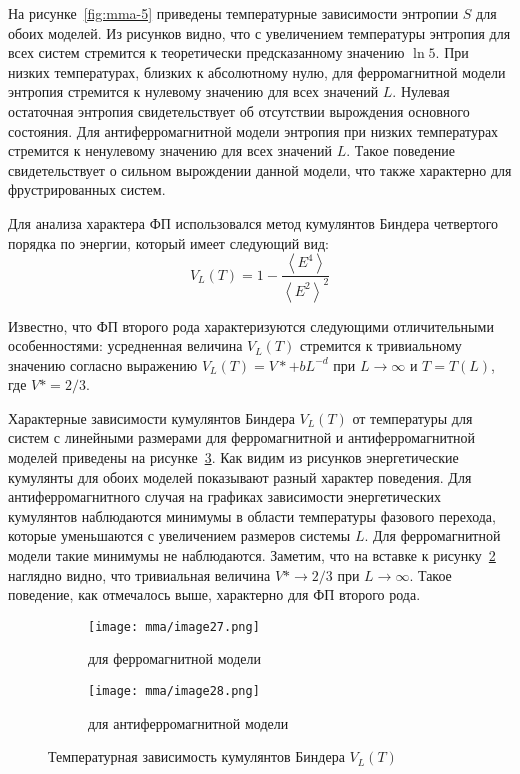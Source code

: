 На рисунке~\ref{fig:mma-5} приведены температурные зависимости энтропии $S$ для обоих моделей. Из рисунков видно, что с увеличением температуры энтропия для всех систем стремится к теоретически предсказанному значению $\ln 5$. При низких температурах, близких к абсолютному нулю, для ферромагнитной модели энтропия стремится к нулевому значению для всех значений $L$. Нулевая остаточная энтропия свидетельствует об отсутствии вырождения основного состояния. Для антиферромагнитной модели энтропия при низких температурах стремится к ненулевому значению для всех значений $L$. Такое поведение свидетельствует о сильном вырождении данной модели, что также характерно для фрустрированных систем.

Для анализа характера ФП использовался метод кумулянтов Биндера четвертого порядка по энергии, который имеет следующий вид:
\begin{equation*}
    V_L (T) = 1 - \frac{\left<E^4\right>}{\left<E^2\right>^2}
\end{equation*}

Известно, что ФП второго рода характеризуются следующими отличительными особенностями: усредненная величина $V_L (T)$ стремится к тривиальному значению согласно выражению $V_L (T) = V* + b L^{-d}$ при $L \to \infty$ и $T = T(L)$, где $V* = 2/3$.

Характерные зависимости кумулянтов Биндера $V_L(T)$ от температуры для систем с линейными размерами для ферромагнитной и антиферромагнитной моделей приведены на рисунке~\ref{fig:mma-6}. Как видим из рисунков энергетические кумулянты для обоих моделей показывают разный характер поведения. Для антиферромагнитного случая на графиках зависимости энергетических кумулянтов наблюдаются минимумы в области температуры фазового перехода, которые уменьшаются с увеличением размеров системы $L$. Для ферромагнитной модели такие минимумы не наблюдаются. Заметим, что на вставке к рисунку~\ref{fig:mma-6b} наглядно видно, что тривиальная величина $V* \to 2/3$ при $L \to \infty$. Такое поведение, как отмечалось выше, характерно для ФП второго рода.
\begin{figure}[ht]
    \centering
    \begin{subfigure}{0.45\textwidth}
        \texttt{[image: mma/image27.png]}
        \caption{для ферромагнитной модели}
        \label{fig:mma-6a}
    \end{subfigure}
    \begin{subfigure}{0.45\textwidth}
        \texttt{[image: mma/image28.png]}
        \caption{для антиферромагнитной модели}
        \label{fig:mma-6b}
    \end{subfigure}
    \caption{Температурная зависимость кумулянтов Биндера $V_L (T)$}
    \label{fig:mma-6}
\end{figure}

